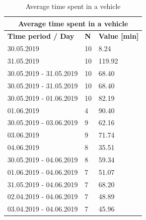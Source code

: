 \begin{table}[]
\begin{tabular}{|l|l|l|}
\hline
\multicolumn{3}{|c|}{\textbf{Average time spent in a vehicle}}     \\ \hline
\textbf{Time period / Day} & \textbf{N} & \textbf{Value {[}min{]}} \\ \hline
30.05.2019                 & 10         & 8.24                     \\ \hline
31.05.2019                 & 10         & 119.92                   \\ \hline
30.05.2019 - 31.05.2019    & 10         & 68.40                    \\ \hline
30.05.2019 - 31.05.2019    & 10         & 68.40                    \\ \hline
30.05.2019 - 01.06.2019    & 10         & 82.19                    \\ \hline
01.06.2019                 & 4          & 90.40                    \\ \hline
30.05.2019 - 03.06.2019    & 9          & 62.16                    \\ \hline
03.06.2019                 & 9          & 71.74                    \\ \hline
04.06.2019                 & 8          & 35.51                    \\ \hline
30.05.2019 - 04.06.2019    & 8          & 59.34                    \\ \hline
01.06.2019 - 04.06.2019    & 7          & 51.07                    \\ \hline
31.05.2019 - 04.06.2019    & 7          & 68.20                    \\ \hline
02.04.2019 - 04.06.2019    & 7          & 48.89                    \\ \hline
03.04.2019 - 04.06.2019    & 7          & 45.96                    \\ \hline
\end{tabular}
\label{results-vehicle}
\caption{Average time spent in a vehicle}
\end{table}

